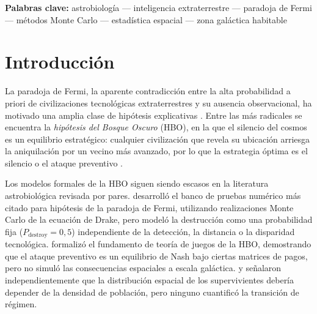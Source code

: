 \documentclass[11pt,a4paper,onecolumn]{article}
\begin{document}
\begin{abstract}
$S_T < 1{,}0$ en todos los parámetros (convergencia alcanzada,
intervalos de confianza $\pm 0{,}04$), confirmando que ningún parámetro
domina individualmente y que las interacciones de alto orden controlan la
varianza de la tasa de destrucción.
Estos hallazgos establecen una transición completa dependiente de la
densidad: en el régimen de baja densidad, la dinámica de destrucción es
indistinguible de la geometría ZGH ($\Delta r \approx 0$); en el régimen
de alta densidad, la dinámica DF domina de forma abrumadora la estructura
espacial ($\Delta r = -0{,}54$, $27\sigma$), concentrando a los
supervivientes muy por encima del nivel de agrupamiento geométrico.
\end{abstract}

\vspace{2mm}
\noindent\textbf{Palabras clave:} astrobiología --- inteligencia extraterrestre --- paradoja de Fermi ---
métodos Monte Carlo --- estadística espacial --- zona galáctica habitable
\vspace{5mm}

\section{Introducción}
\label{sec:intro}

La paradoja de Fermi, la aparente contradicción entre la alta
probabilidad a priori de civilizaciones tecnológicas extraterrestres y
su ausencia observacional, ha motivado una amplia clase de hipótesis
explicativas \citep{fermi1950,hart1975,brin1983,webb2002}.
Entre las más radicales se encuentra la \emph{hipótesis del Bosque
Oscuro} (HBO), en la que el silencio del cosmos es un equilibrio
estratégico: cualquier civilización que revela su ubicación arriesga
la aniquilación por un vecino más avanzado, por lo que la estrategia
óptima es el silencio o el ataque preventivo
\citep{cixin2008,devladar2013}.

Los modelos formales de la HBO siguen siendo escasos en la literatura
astrobiológica revisada por pares.
\citet{forgan2009} desarrolló el banco de pruebas numérico más citado
para hipótesis de la paradoja de Fermi, utilizando realizaciones Monte
Carlo de la ecuación de Drake, pero modeló la destrucción como una
probabilidad fija ($P_\text{destroy} = 0{,}5$) independiente de la
detección, la distancia o la disparidad tecnológica.
\citet{devladar2013} formalizó el fundamento de teoría de juegos de la
HBO, demostrando que el ataque preventivo es un equilibrio de Nash bajo
ciertas matrices de pagos, pero no simuló las consecuencias espaciales
a escala galáctica.
\citet{foucher2023} y \citet{forgan2011} señalaron independientemente
que la distribución espacial de los supervivientes debería depender de
la densidad de población, pero ninguno cuantificó la transición de
régimen.
\end{document}
